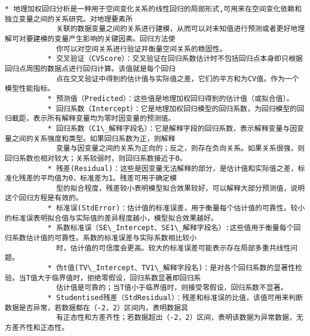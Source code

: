 \documentclass[11pt]{article}
\begin{document}
\begin{Verbatim}[commandchars=\\\{\}]
          * 地理加权回归分析是一种用于空间变化关系的线性回归的局部形式,可用来在空间变化依赖和独立变量之间的关系研究。对地理要素所
            关联的数据变量之间的关系进行建模，从而可以对未知值进行预测或者更好地理解可对要建模的变量产生影响的关键因素。回归方法使
            你可以对空间关系进行验证并衡量空间关系的稳固性。
          * 交叉验证（CVScore）：交叉验证在回归系数估计时不包括回归点本身即只根据回归点周围的数据点进行回归计算。该值就是每个回归
            点在交叉验证中得到的估计值与实际值之差，它们的平方和为CV值。作为一个模型性能指标。
          * 预测值（Predicted）：这些值是地理加权回归得到的估计值（或拟合值）。
          * 回归系数（Intercept）：它是地理加权回归模型的回归系数，为回归模型的回归截距，表示所有解释变量均为零时因变量的预测值。
          * 回归系数（C1\_解释字段名）：它是解释字段的回归系数，表示解释变量与因变量之间的关系强度和类型。如果回归系数为正，则解释
            变量与因变量之间的关系为正向的；反之，则存在负向关系。如果关系很强，则回归系数也相对较大；关系较弱时，则回归系数接近于0。
          * 残差(Residual)：这些是因变量无法解释的部分，是估计值和实际值之差，标准化残差的平均值为0，标准差为1。残差可用于确定模
            型的拟合程度，残差较小表明模型拟合效果较好，可以解释大部分预测值，说明这个回归方程是有效的。
          * 标准误(StdError)：估计值的标准误差，用于衡量每个估计值的可靠性。较小的标准误表明拟合值与实际值的差异程度越小，模型拟合效果越好。
          * 系数标准误（SE\_Intercept、SE1\_解释字段名）:这些值用于衡量每个回归系数估计值的可靠性。系数的标准误差与实际系数相比较小
            时，估计值的可信度会更高。较大的标准误差可能表示存在局部多重共线性问题。
          * 伪t值(TV\_Intercept、TV1\_解释字段名)：是对各个回归系数的显著性检验。当T值大于临界值时，拒绝零假设，回归系数显著即回归系
            估计值是可靠的；当T值小于临界值时，则接受零假设，回归系数不显著。
          * Studentised残差（StdResidual）：残差和标准误的比值，该值可用来判断数据是否异常，若数据都在（-2，2）区间内，表明数据具
            有正态性和方差齐性；若数据超出（-2，2）区间，表明该数据为异常数据，无方差齐性和正态性。
        

\end{Verbatim}
\end{document}
